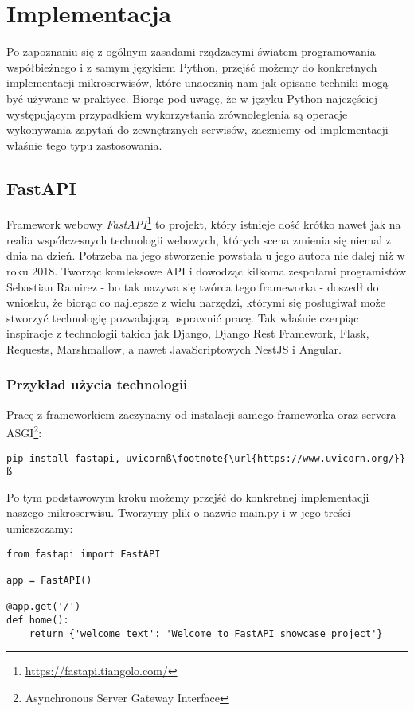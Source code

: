 \chapter{Implementacja}

Po zapoznaniu się z ogólnym zasadami rządzacymi światem programowania współbieżnego i z samym językiem Python, przejść możemy do konkretnych implementacji mikroserwisów, które unaocznią nam jak opisane techniki mogą być używane w praktyce. Biorąc pod uwagę, że w języku Python najczęściej występującym przypadkiem wykorzystania zrównoleglenia są operacje wykonywania zapytań do zewnętrznych serwisów, zaczniemy od implementacji właśnie tego typu zastosowania.


\section{FastAPI}
Framework webowy \emph{FastAPI}\footnote{\url{https://fastapi.tiangolo.com/}} to projekt, który istnieje dość krótko nawet jak na realia współczesnych technologii webowych, których scena zmienia się niemal z dnia na dzień. Potrzeba na jego stworzenie powstała u jego autora nie dalej niż w roku 2018. Tworząc komleksowe API i dowodząc kilkoma zespołami programistów Sebastian Ramirez - bo tak nazywa się twórca tego frameworka - doszedł do wniosku, że biorąc co najlepsze z wielu narzędzi, którymi się posługiwał może stworzyć technologię pozwalającą usprawnić pracę. Tak właśnie czerpiąc inspiracje z technologii takich jak Django, Django Rest Framework, Flask, Requests, Marshmallow, a nawet JavaScriptowych NestJS i Angular.

\subsection{Przykład użycia technologii}
Pracę z frameworkiem zaczynamy od instalacji samego frameworka oraz servera ASGI\footnote{Asynchronous Server Gateway Interface}:
\begin{lstlisting}[escapechar=ß]
pip install fastapi, uvicornß\footnote{\url{https://www.uvicorn.org/}}ß
\end{lstlisting}
Po tym podstawowym kroku możemy przejść do konkretnej implementacji naszego mikroserwisu. Tworzymy plik o nazwie main.py i w jego treści umieszczamy:

\begin{lstlisting}
from fastapi import FastAPI

app = FastAPI()

@app.get('/')
def home():
    return {'welcome_text': 'Welcome to FastAPI showcase project'}
\end{lstlisting}

